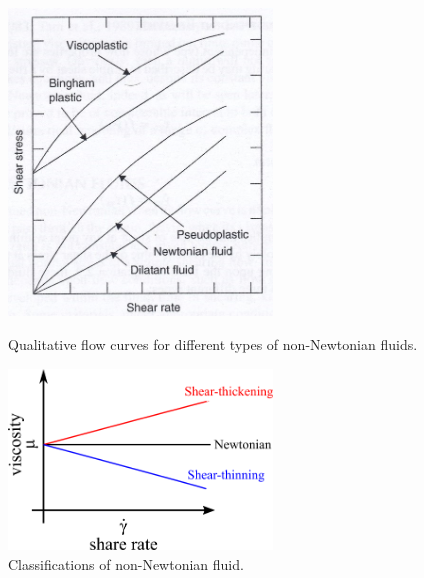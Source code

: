 \begin{center}
    \begin{figure}[h]
        \centering
        \includegraphics[width=7.0cm,clip]{1-Background/1-fluid-curve.jpg}
        \caption{Qualitative flow curves for different types of non-Newtonian fluids\cite{ref:1}.}
        \label{fig:1-fluid-curve}
        \centering
        \includegraphics[width=7.0cm,clip]{1-Background/2-Newton-fluid.png}
        \caption{Classifications of non-Newtonian fluid.}
        \label{fig:2-Newton-fluid}
    \end{figure}

    \newpage


\end{center}

